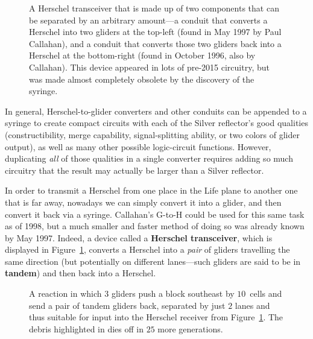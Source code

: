 \begin{figure}[!htb]
	\centering
	\caption{A Herschel transceiver that is made up of two components that can be separated by an arbitrary amount---a conduit that converts a Herschel into two gliders at the top-left (found in May 1997 by Paul Callahan), and a conduit that converts those two gliders back into a Herschel at the bottom-right (found in October 1996, also by Callahan). This device appeared in lots of pre-2015 circuitry, but was made almost completely obsolete by the discovery of the syringe.}
	\label{fig:herschel_transceiver}
\end{figure}

In general, Herschel-to-glider converters and other conduits can be appended to a syringe to create compact circuits with each of the Silver reflector's good qualities (constructibility, merge capability, signal-splitting ability, or two colors of glider output), as well as many other possible logic-circuit functions. However, duplicating \emph{all} of those qualities in a single converter requires adding so much circuitry that the result may actually be larger than a Silver reflector.

In order to transmit a Herschel from one place in the Life plane to another one that is far away, nowadays we can simply convert it into a glider, and then convert it back via a syringe. Callahan's G-to-H could be used for this same task as of 1998, but a much smaller and faster method of doing so was already known by May 1997. Indeed, a device called a \textbf{Herschel transceiver}, which is displayed in Figure~\ref{fig:herschel_transceiver}, converts a Herschel into a \emph{pair} of gliders travelling the same direction (but potentially on different lanes---such gliders are said to be in \textbf{tandem}) and then back into a Herschel.

\begin{figure}[!htb]
	\centering{}
	\caption{A reaction in which $3$ gliders push a block southeast by $10$~cells and send a pair of tandem gliders back, separated by just $2$ lanes and thus suitable for input into the Herschel receiver from Figure~\ref{fig:herschel_transceiver}. The debris highlighted in  dies off in $25$ more generations.}\label{fig:block_pusher}
\end{figure}

